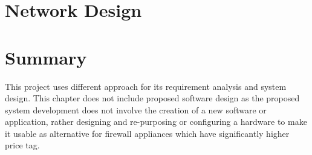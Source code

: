 \documentclass[../index.tex]{subfiles}
\begin{document}
\section{Network Design}



\section{Summary}

This project uses different approach for its requirement analysis and system design. This chapter
does not include proposed software design as the proposed system development does not involve the
creation of a new software or application, rather designing and re-purposing or configuring a
hardware to make it usable as alternative for firewall appliances which have significantly higher
price tag.
\end{document}
